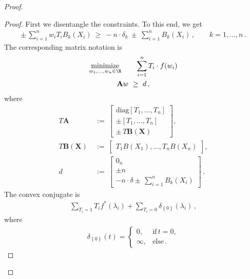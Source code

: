 \begin{proof}
\begin{lemma}
  \end{lemma}
  \begin{proof}
    First we disentangle the constraints.
    To this end, we get
    \begin{gather*}
      \pm\,\sum_{i = 1}^{n} w_i T_i B_k(X_i)
      \ 
      \ge
      \ 
      -n\cdot\delta_k
      \ 
      \pm 
      \ 
      \sum_{i = 1}^{n} B_k(X_i)
      \,,
      \qquad
      k=1,\ldots,n
      \,.
    \end{gather*}
    The corresponding matrix notation is
 \begin{gather*}
    \underset{w_1, \ldots, w_n \in \R}{\mathrm{minimize}}
    \qquad
    \sum_{i = 1}^{n} T_i \cdot f(w_i)
    \\
    \mathbf{A}w 
    \ 
    \ge
    \ 
    d
    \,,
\end{gather*}
where
\begin{align*}
    T\mathbf{A}
    &
    \ 
    :=
    \ 
    \begin{bmatrix}
      \mathrm{diag}
      [T_1,\ldots,T_n]
      \\
      \pm
      [T_1,\ldots,T_n]
      \\
      \pm\,T\mathbf{B}(\mathbf{X})
    \end{bmatrix}
    ,
    \\
    T\mathbf{B}(\mathbf{X})
    &
    \ 
    :=
    \ 
    \begin{bmatrix}
      T_1B(X_1), \ldots, T_nB(X_n)
    \end{bmatrix}
    ,
    \\
    d
    &
    \ 
    :=
    \ 
    \begin{bmatrix}
      0_n
      \\
      \pm n
      \\
      -n\cdot\delta 
      \pm\,
      \sum_{i = 1}^{n} B_k(X_i)
    \end{bmatrix}
    \,.
  \end{align*}
The convex conjugate is
\begin{gather*}
  \sum_{T_i=1} T_i f^*(\lambda_i)
  +
  \sum_{T_i=0} 
  \delta_{\left\{ 0 \right\}}(\lambda_i)
  \,,
\end{gather*}
where
\begin{gather*}
  \delta_{\left\{ 0 \right\}}
  (t)
  =
  \begin{cases}
    0,& \text{if}\, t=0,\\
    \infty,& \text{else}\,.
  \end{cases}
\end{gather*}

\end{proof}
\end{proof}
